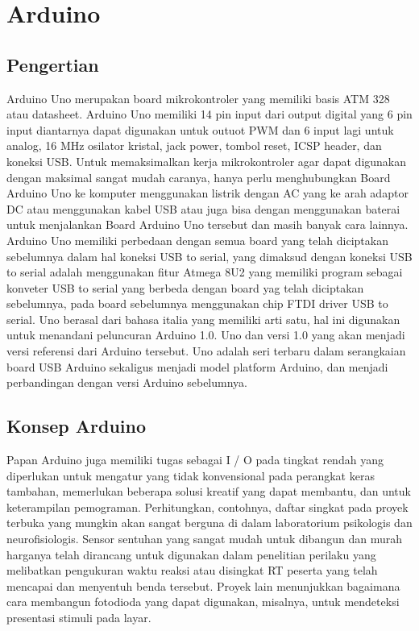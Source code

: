 \section{Arduino}
\subsection{Pengertian}
Arduino Uno merupakan board mikrokontroler yang memiliki basis ATM 328 atau datasheet. Arduino Uno memiliki 14 pin input dari output digital yang 6 pin input diantarnya dapat digunakan untuk outuot PWM dan 6 input lagi untuk analog, 16 MHz osilator kristal, jack power, tombol reset, ICSP header, dan koneksi USB. Untuk memaksimalkan kerja mikrokontroler agar dapat digunakan dengan maksimal sangat mudah caranya, hanya perlu menghubungkan Board Arduino Uno ke komputer menggunakan listrik dengan  AC yang ke arah  adaptor DC atau menggunakan kabel USB atau  juga bisa dengan menggunakan baterai untuk menjalankan Board Arduino Uno tersebut dan masih banyak cara lainnya.
Arduino Uno memiliki perbedaan dengan semua board yang telah diciptakan sebelumnya dalam hal koneksi USB to serial, yang dimaksud dengan koneksi USB to serial adalah menggunakan fitur Atmega 8U2 yang memiliki program sebagai konveter USB to serial yang berbeda dengan board yag telah diciptakan sebelumnya, pada board sebelumnya menggunakan chip FTDI driver USB to serial.
Uno berasal dari bahasa italia yang memiliki arti satu, hal ini digunakan untuk menandani peluncuran Arduino 1.0. Uno dan versi 1.0 yang akan menjadi versi referensi dari Arduino tersebut. Uno adalah seri terbaru dalam serangkaian board USB Arduino sekaligus menjadi model platform Arduino, dan menjadi perbandingan dengan versi Arduino sebelumnya.
\subsection{Konsep Arduino}
Papan Arduino juga memiliki tugas sebagai I / O pada tingkat rendah yang diperlukan untuk mengatur yang tidak konvensional  pada perangkat keras tambahan, memerlukan beberapa solusi kreatif yang dapat membantu, dan untuk keterampilan pemograman. Perhitungkan, contohnya, daftar singkat pada proyek terbuka yang mungkin akan sangat berguna di dalam laboratorium psikologis dan neurofisiologis. Sensor sentuhan yang sangat mudah untuk dibangun dan murah harganya telah dirancang untuk digunakan dalam penelitian perilaku yang melibatkan pengukuran waktu reaksi atau disingkat RT peserta yang telah mencapai dan menyentuh benda tersebut. Proyek lain menunjukkan bagaimana cara membangun fotodioda yang dapat digunakan, misalnya, untuk mendeteksi presentasi stimuli pada layar.
